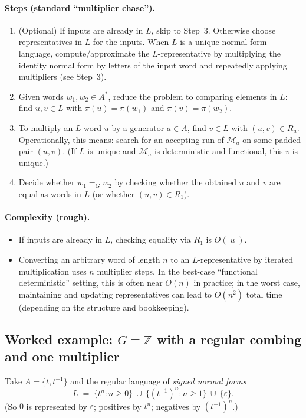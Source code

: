\documentclass[11pt]{article}
\theoremstyle{definition}
\theoremstyle{plain}
\theoremstyle{remark}
\begin{document}
\paragraph{Steps (standard ``multiplier chase'').}
\begin{enumerate}[leftmargin=2.2em]
\item (Optional) If inputs are already in $L$, skip to Step~3. Otherwise choose representatives in $L$ for the inputs.
When $L$ is a unique normal form language, compute/approximate the $L$-representative by multiplying the identity normal form
by letters of the input word and repeatedly applying multipliers (see Step~3).
\item Given words $w_1,w_2\in A^*$, reduce the problem to comparing elements in $L$:
find $u,v\in L$ with $\pi(u)=\pi(w_1)$ and $\pi(v)=\pi(w_2)$.
\item To multiply an $L$-word $u$ by a generator $a\in A$, find $v\in L$ with $(u,v)\in R_a$.
Operationally, this means: search for an accepting run of $\mathcal M_a$ on some padded pair $(u,v)$.
(If $L$ is unique and $\mathcal M_a$ is deterministic and functional, this $v$ is unique.)
\item Decide whether $w_1=_G w_2$ by checking whether the obtained $u$ and $v$ are equal as words in $L$ (or whether $(u,v)\in R_1$).
\end{enumerate}

\paragraph{Complexity (rough).}
\begin{itemize}[leftmargin=2em]
\item If inputs are already in $L$, checking equality via $R_1$ is $O(|u|)$.
\item Converting an arbitrary word of length $n$ to an $L$-representative by iterated multiplication uses $n$ multiplier steps.
In the best-case ``functional deterministic'' setting, this is often near $O(n)$ in practice;
in the worst case, maintaining and updating representatives can lead to $O(n^2)$ total time (depending on the structure and bookkeeping).
\end{itemize}

\subsection*{Worked example: $G=\mathbb Z$ with a regular combing and one multiplier}
Take $A=\{t,t^{-1}\}$ and the regular language of \emph{signed normal forms}
\[
L \;=\; \{t^n:n\ge 0\}\ \cup\ \{(t^{-1})^n:n\ge 1\}\ \cup\ \{\varepsilon\}.
\]
(So $0$ is represented by $\varepsilon$; positives by $t^n$; negatives by $(t^{-1})^n$.)
\end{document}
